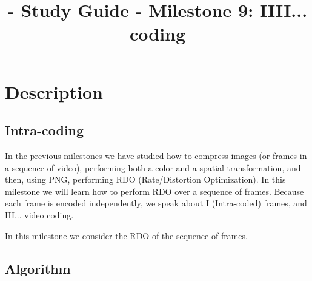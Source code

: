 
\title{\SM{} - Study Guide - Milestone 9: IIII... coding}

\maketitle

\tableofcontents

\section{Description}

\subsection{Intra-coding}

In the previous milestones we have studied how to compress images (or
frames in a sequence of video), performing both a color and a spatial
transformation, and then, using PNG, performing RDO (Rate/Distortion
Optimization). In this milestone we will learn how to perform RDO over
a sequence of frames. Because each frame is encoded independently, we
speak about I (Intra-coded) frames, and III... video coding.

In this milestone we consider the RDO of the sequence of frames.

\subsection{Algorithm}

